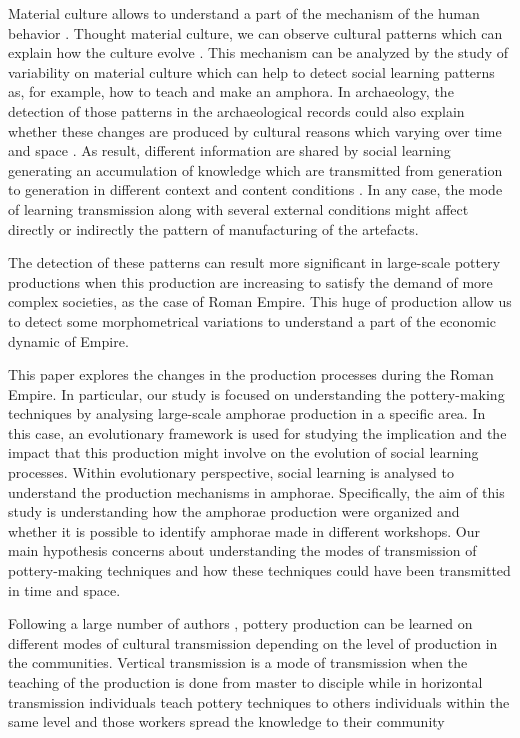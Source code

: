 \documentclass[review]{elsarticle}
\begin{document}
Material culture allows to understand a part of the mechanism of the human behavior \citep{richerson2005not, schillinger_copying_2016}. Thought material culture, we can observe cultural patterns which can explain how the culture evolve \citep{richerson2005not}. This mechanism can be analyzed by the study of variability on material culture which can help to detect social learning patterns as, for example, how to teach and make an amphora. In archaeology, the detection of those patterns in the archaeological records could also explain whether these changes are produced by cultural reasons which varying over time and space \citep{basalla1988evolution}. As result, different information are shared by social learning generating an accumulation of knowledge which are transmitted from generation to generation in different context and content conditions \citep{eerkens_jelmer_cultural_2005, neff1992ceramics,henrich_evolution_2003, boyd_cultural_2011}. In any case, the mode of learning transmission along with several external conditions might affect directly or indirectly the pattern of manufacturing of the artefacts.

The detection of these patterns can result more significant in large-scale pottery productions when this production are increasing to satisfy the demand of more complex societies, as the case of Roman Empire. This huge of production allow us to detect some morphometrical variations to understand a part of the economic dynamic of Empire. 

This paper explores the changes in the production processes during the Roman Empire. In particular, our study is focused on understanding the pottery-making techniques by analysing large-scale amphorae production in a specific area. In this case, an evolutionary framework \citep{mesoudi_cultural_2015, shennan_evolution_2008} is used for studying the implication and the impact that this production might involve on the  evolution of social learning processes. Within evolutionary perspective, social learning is analysed to understand the production mechanisms in amphorae. Specifically, the aim of this study is understanding how the amphorae production were organized and whether it is possible to identify amphorae made in different workshops. Our main hypothesis concerns about understanding the modes of transmission of pottery-making techniques and how these techniques could have been transmitted in time and space. 

Following a large number of authors \citep{cavalli-sforza_cultural_1981, hosfield_modes_2009}, pottery production can be learned on different modes of cultural transmission depending on the level of production in the communities. Vertical transmission is a mode of transmission when the teaching of the production is done from master to disciple while in horizontal transmission individuals teach pottery techniques to others individuals within the same level and those workers spread the knowledge to their community \citep{epstein_craft_1998}
\end{document}
